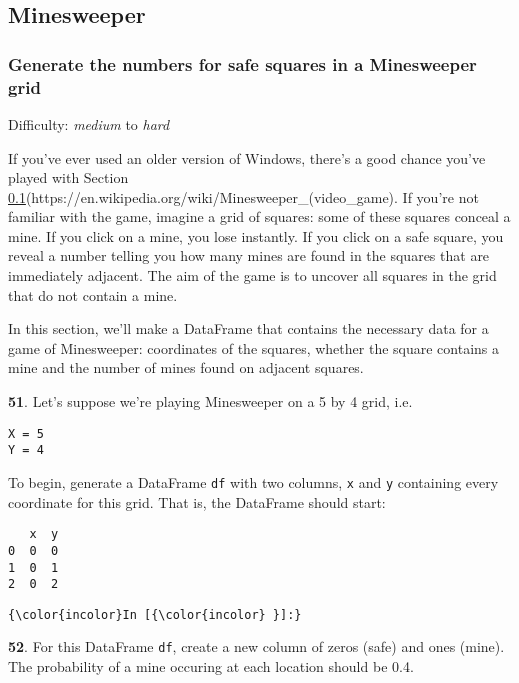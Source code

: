 \documentclass[11pt]{article}
\begin{document}
    \subsection{Minesweeper}\label{minesweeper}

\subsubsection{Generate the numbers for safe squares in a Minesweeper
grid}\label{generate-the-numbers-for-safe-squares-in-a-minesweeper-grid}

Difficulty: \emph{medium} to \emph{hard}

If you've ever used an older version of Windows, there's a good chance
you've played with
Section \ref{minesweeper}(https://en.wikipedia.org/wiki/Minesweeper\_(video\_game).
If you're not familiar with the game, imagine a grid of squares: some of
these squares conceal a mine. If you click on a mine, you lose
instantly. If you click on a safe square, you reveal a number telling
you how many mines are found in the squares that are immediately
adjacent. The aim of the game is to uncover all squares in the grid that
do not contain a mine.

In this section, we'll make a DataFrame that contains the necessary data
for a game of Minesweeper: coordinates of the squares, whether the
square contains a mine and the number of mines found on adjacent
squares.

    \textbf{51}. Let's suppose we're playing Minesweeper on a 5 by 4 grid,
i.e.

\begin{verbatim}
X = 5
Y = 4
\end{verbatim}

To begin, generate a DataFrame \texttt{df} with two columns,
\texttt{\textquotesingle{}x\textquotesingle{}} and
\texttt{\textquotesingle{}y\textquotesingle{}} containing every
coordinate for this grid. That is, the DataFrame should start:

\begin{verbatim}
   x  y
0  0  0
1  0  1
2  0  2
\end{verbatim}

    \begin{Verbatim}[commandchars=\\\{\}]
{\color{incolor}In [{\color{incolor} }]:} 
\end{Verbatim}


    \textbf{52}. For this DataFrame \texttt{df}, create a new column of
zeros (safe) and ones (mine). The probability of a mine occuring at each
location should be 0.4.
\end{document}
